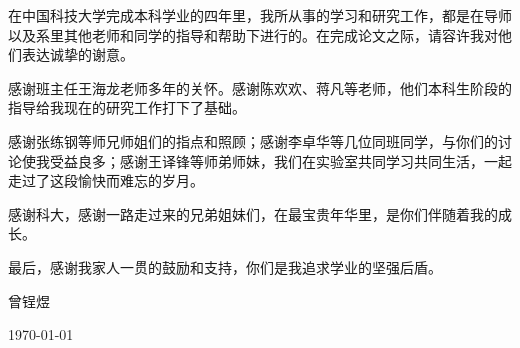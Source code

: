 \begin{acknowledgements}

在中国科技大学完成本科学业的四年里，我所从事的学习和研究工作，都是在导师以及系里其他老师和同学的指导和帮助下进行的。在完成论文之际，请容许我对他们表达诚挚的谢意。

感谢班主任王海龙老师多年的关怀。感谢陈欢欢、蒋凡等老师，他们本科生阶段的指导给我现在的研究工作打下了基础。

感谢张练钢等师兄师姐们的指点和照顾；感谢李卓华等几位同班同学，与你们的讨论使我受益良多；感谢王译锋等师弟师妹，我们在实验室共同学习共同生活，一起走过了这段愉快而难忘的岁月。

感谢科大，感谢一路走过来的兄弟姐妹们，在最宝贵年华里，是你们伴随着我的成长。

最后，感谢我家人一贯的鼓励和支持，你们是我追求学业的坚强后盾。

\vskip 18pt

\begin{flushright}

曾锃煜

\today

\end{flushright}
\end{acknowledgements}
